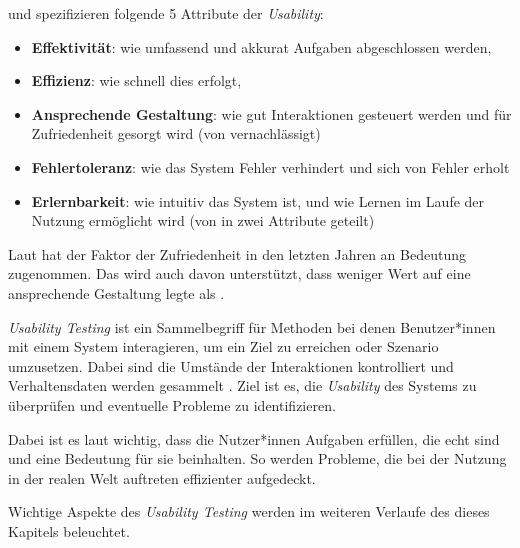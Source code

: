 \textcite{quesenberyDimensionsUsability2003} und \textcite{nielsenUsabilityEngineering1994}
spezifizieren folgende 5 Attribute der \textit{Usability}:
\begin{itemize}
  \item \textbf{Effektivität}: wie umfassend und akkurat Aufgaben abgeschlossen werden,
  \item \textbf{Effizienz}: wie schnell dies erfolgt,
  \item \textbf{Ansprechende Gestaltung}: wie gut Interaktionen gesteuert werden und für
    Zufriedenheit gesorgt wird (von \textcite{nielsenUsabilityEngineering1994} vernachlässigt)
  \item \textbf{Fehlertoleranz}: wie das System Fehler verhindert und sich von Fehler erholt
  \item \textbf{Erlernbarkeit}: wie intuitiv das System ist, und wie Lernen im Laufe der Nutzung
    ermöglicht wird (von \textcite{nielsenUsabilityEngineering1994} in zwei Attribute geteilt)
\end{itemize}
Laut \textcite{barnumUsabilityTesting2021} hat der Faktor der Zufriedenheit in den letzten Jahren an
Bedeutung zugenommen. Das wird auch davon unterstützt, dass
\textcite{nielsenUsabilityEngineering1994} weniger Wert auf eine ansprechende Gestaltung legte als
\textcite{quesenberyDimensionsUsability2003}.

\newpage

\textit{Usability Testing} ist ein Sammelbegriff für Methoden bei denen Benutzer*innen mit einem
System interagieren, um ein Ziel zu erreichen oder Szenario umzusetzen. Dabei sind die Umstände der
Interaktionen kontrolliert und Verhaltensdaten werden gesammelt
\parencite{wichanskyUsabilityTesting2000}. Ziel ist es, die \textit{Usability} des Systems zu
überprüfen und eventuelle Probleme zu identifizieren.

Dabei ist es laut \textcite{barnumUsabilityTesting2021} wichtig, dass die Nutzer*innen Aufgaben
erfüllen, die echt sind und eine Bedeutung für sie beinhalten. So werden Probleme, die bei der
Nutzung in der realen Welt auftreten effizienter aufgedeckt.

Wichtige Aspekte des \textit{Usability Testing} werden im weiteren Verlaufe des dieses Kapitels
beleuchtet.

